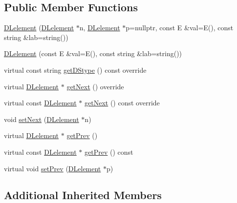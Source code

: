 \subsection*{Public Member Functions}
\begin{DoxyCompactItemize}
\item 
\hyperlink{classbridges_1_1datastructure_1_1_d_lelement_a7384d570c355bb4762c98b79d4c1e988}{D\+Lelement} (\hyperlink{classbridges_1_1datastructure_1_1_d_lelement}{D\+Lelement} $\ast$n, \hyperlink{classbridges_1_1datastructure_1_1_d_lelement}{D\+Lelement} $\ast$p=nullptr, const E \&val=E(), const string \&lab=string())
\item 
\hyperlink{classbridges_1_1datastructure_1_1_d_lelement_af9c0dc9b417de0466a47be904cd845f6}{D\+Lelement} (const E \&val=E(), const string \&lab=string())
\item 
virtual const string \hyperlink{classbridges_1_1datastructure_1_1_d_lelement_a736ba8e6901608fb0ab04d781d2cceee}{get\+D\+Stype} () const override
\item 
virtual \hyperlink{classbridges_1_1datastructure_1_1_d_lelement}{D\+Lelement} $\ast$ \hyperlink{classbridges_1_1datastructure_1_1_d_lelement_a63212051ea77d74bd751dea00288d2be}{get\+Next} () override
\item 
virtual const \hyperlink{classbridges_1_1datastructure_1_1_d_lelement}{D\+Lelement} $\ast$ \hyperlink{classbridges_1_1datastructure_1_1_d_lelement_a8599e5be5fc1771d4e8a40f6de67b4a7}{get\+Next} () const override
\item 
void \hyperlink{classbridges_1_1datastructure_1_1_d_lelement_ab0fe212dd0e3795b8f3f7978c6bdf805}{set\+Next} (\hyperlink{classbridges_1_1datastructure_1_1_d_lelement}{D\+Lelement} $\ast$n)
\item 
virtual \hyperlink{classbridges_1_1datastructure_1_1_d_lelement}{D\+Lelement} $\ast$ \hyperlink{classbridges_1_1datastructure_1_1_d_lelement_a0edfa823d0fc6f3dba58f85dbf5a11ff}{get\+Prev} ()
\item 
virtual const \hyperlink{classbridges_1_1datastructure_1_1_d_lelement}{D\+Lelement} $\ast$ \hyperlink{classbridges_1_1datastructure_1_1_d_lelement_a66917ba9a9270b8f6b5e4ff258bf3e70}{get\+Prev} () const
\item 
virtual void \hyperlink{classbridges_1_1datastructure_1_1_d_lelement_a748d1ad511509996d8268e75d6ecfeae}{set\+Prev} (\hyperlink{classbridges_1_1datastructure_1_1_d_lelement}{D\+Lelement} $\ast$p)
\end{DoxyCompactItemize}
\subsection*{Additional Inherited Members}


